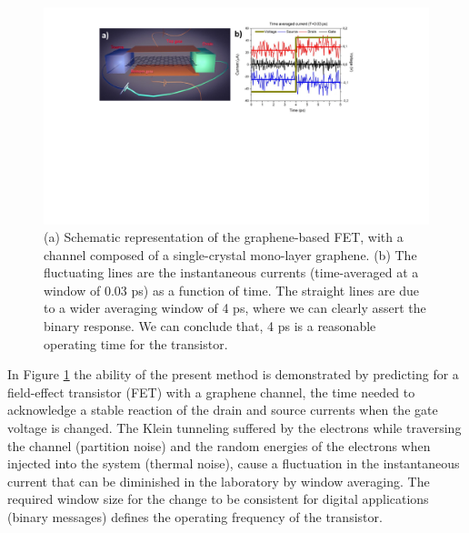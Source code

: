 \documentclass[11pt, a4paper]{article} %
\begin{document}
\begin{figure}[h!]
  \centering
  \hspace*{-0.3cm}
   \includegraphics[width=0.71\linewidth]{Figures/figurefinal.pdf}\vspace{-0.3cm}
   \caption{(a) Schematic representation of the graphene-based FET, with a channel composed of a single-crystal mono-layer graphene. (b) The fluctuating lines are the instantaneous currents (time-averaged at a window of $0.03$ ps) as a function of time. The straight lines are due to a wider averaging window of 4 ps, where we can clearly assert the binary response. We can conclude that, 4 ps is a reasonable operating time for the transistor.}
  \label{fig:fig}
\end{figure}

In Figure \ref{fig:fig} the ability of the present method is demonstrated \cite{inject,Thz} by predicting for a field-effect transistor (FET) with a graphene channel, the time needed to acknowledge a stable reaction of the drain and source currents when the gate voltage is changed. The Klein tunneling suffered by the electrons while traversing the channel (partition noise) and the random energies of the electrons when injected into the system (thermal noise), cause a fluctuation in the instantaneous current that can be diminished in the laboratory by window averaging. The required window size for the change to be consistent for digital applications (binary messages) defines the operating frequency of the transistor.\vspace{-0.25cm}
\end{document}
